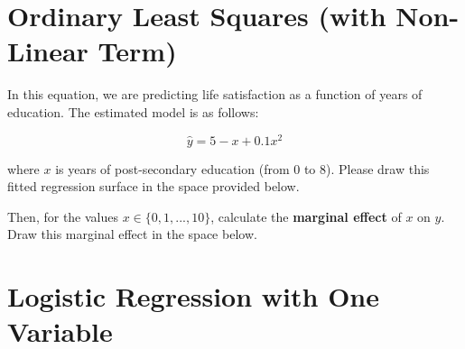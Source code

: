 \documentclass[a4paper,12pt]{article}
\begin{document}
\clearpage

\section{Ordinary Least Squares (with Non-Linear Term)}

In this equation, we are predicting life satisfaction as a function of years of education. The estimated model is as follows:

\begin{equation}
\hat{y} = 5 - x + 0.1 x^2
\end{equation}

\noindent where $x$ is years of post-secondary education (from 0 to 8). Please draw this fitted regression surface in the space provided below. 

\begin{center}
\end{center}

\noindent Then, for the values $x \in \{0,1,...,10\}$, calculate the \textbf{marginal effect} of $x$ on $y$. Draw this marginal effect in the space below.

\begin{center}
\end{center}



\clearpage

\section{Logistic Regression with One Variable}
\end{document}
